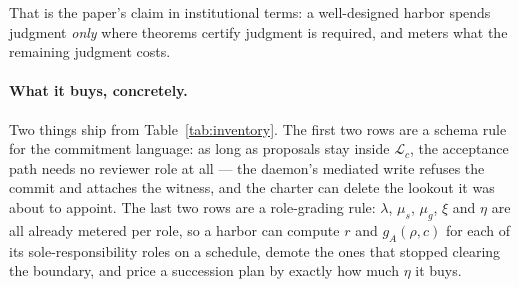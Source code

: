 \documentclass[11pt,a4paper]{article}
\begin{document}
\noindent That is the paper's claim in institutional terms: a well-designed harbor spends judgment \emph{only} where theorems
certify judgment is required, and meters what the remaining judgment costs.

\paragraph{What it buys, concretely.} Two things ship from Table~\ref{tab:inventory}. The first two rows are a schema rule for the
commitment language: as long as proposals stay inside $\mathcal{L}_c$, the acceptance path needs no reviewer role at all --- the
daemon's mediated write refuses the commit and attaches the witness, and the charter can delete the lookout it was about to
appoint. The last two rows are a role-grading rule: $\lambda$, $\mu_s$, $\mu_g$, $\xi$ and $\eta$ are all already metered per
role, so a harbor can compute $r$ and $g_A(\rho,c)$ for each of its sole-responsibility roles on a schedule, demote the ones that
stopped clearing the boundary, and price a succession plan by exactly how much $\eta$ it buys.
\end{document}
